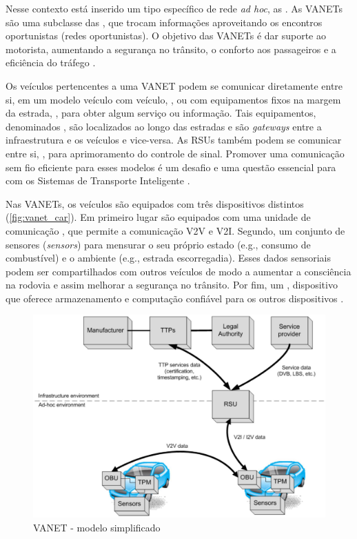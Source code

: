 \documentclass[mestrado, pre-defesa, english, brazil]{packages/icmc}
\begin{document}
Nesse contexto está inserido um tipo específico de rede \textit{ad hoc}, as . As VANETs são uma subclasse das , que trocam informações aproveitando os encontros oportunistas (redes oportunistas). O objetivo das VANETs é dar suporte ao motorista, aumentando a segurança no trânsito, o conforto aos passageiros e a eficiência do tráfego \cite{Fuentes-2011}.

Os veículos pertencentes a uma VANET podem se comunicar diretamente entre si, em um modelo veículo com veículo, , ou com equipamentos fixos na margem da estrada, , para obter algum serviço ou informação. Tais equipamentos, denominados , são localizados ao longo das estradas e são \textit{gateways} entre a infraestrutura e os veículos e vice-versa. As RSUs também podem se comunicar entre si, , para aprimoramento do controle de sinal. Promover uma comunicação sem fio eficiente para esses modelos é um desafio e uma questão essencial para com os Sistemas de Transporte Inteligente \cite{Faezipour-2012,tangade-2013, Kishimoto-2014}.

Nas VANETs, os veículos são equipados com três dispositivos distintos (\autoref{fig:vanet_car}). Em primeiro lugar são equipados com uma unidade de comunicação , que permite a comunicação V2V e V2I. Segundo, um conjunto de sensores (\textit{sensors}) para mensurar o seu próprio estado (e.g., consumo de combustível) e o ambiente (e.g., estrada escorregadia). Esses dados sensoriais podem ser compartilhados com outros veículos de modo a aumentar a consciência na rodovia e assim melhorar a segurança no trânsito. Por fim, um , dispositivo que oferece armazenamento e computação confiável para os outros dispositivos \cite{Fuentes-2011}.

\begin{figure}[!htbp]
    \centering
    \caption{\label{fig:vanet_car}VANET - modelo simplificado}
    \includegraphics[width=14cm]{img/vanet-car.jpeg}
\end{figure}
\end{document}
